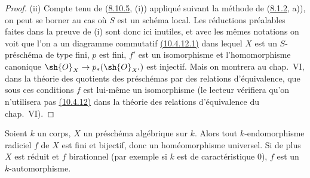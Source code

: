\begin{proof}
\textup{(ii)} Compte tenu de
({\hyperref[canon-index.ega4.c04.thm.8-10-5]{8.10.5}}, (i)) appliqué suivant la
méthode de ({\hyperref[canon-index.ega4.c04.statement.8-1-2]{8.1.2}}, a)), on peut
se borner au cas où $S$ est un schéma local. Les réductions préalables
faites dans la preuve de (i) sont donc ici inutiles, et avec les mêmes
notations on voit que l'on a un diagramme commutatif
{\hyperlink{ega4.c04.sec.10-4-12-1}{(10.4.12.1)}} dans lequel $X$ est
un $S$-préschéma de type fini, $p$ est fini, $f'$ est un isomorphisme et
l'homomorphisme canonique $\sh{O}_X\to p_*(\sh{O}_{X'})$ est injectif.
Mais on montrera au chap.~VI, dans la théorie des quotients des
préschémas par des relations d'équivalence, que sous ces conditions $f$
est lui-même un isomorphisme (le lecteur vérifiera qu'on n'utilisera pas
{\hyperlink{ega4.c04.cor.10-4-12}{(10.4.12)}} dans la théorie des
relations d'équivalence du chap.~VI).
\end{proof}

\begin{corollary}[10.4.13]
Soient $k$ un corps, $X$ un préschéma algébrique sur $k$. Alors tout
$k$-endomorphisme radiciel $f$ de $X$ est fini et bijectif, donc un
homéomorphisme universel. Si de plus $X$ est réduit et $f$ birationnel
(par exemple si $k$ est de caractéristique 0), $f$ est un
$k$-automorphisme.
\end{corollary}

